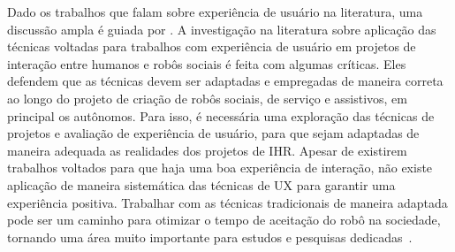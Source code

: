 Dado os trabalhos que falam sobre experiência de usuário na literatura, uma discussão ampla é guiada por \textcite{alenljung:2017}. A investigação na literatura sobre aplicação das técnicas voltadas para trabalhos com experiência de usuário em projetos de interação entre humanos e robôs sociais é feita com algumas críticas. Eles defendem que as técnicas devem ser adaptadas e empregadas de maneira correta ao longo do projeto de criação de robôs sociais, de serviço e assistivos, em principal os autônomos. Para isso, é necessária uma exploração das técnicas de projetos e avaliação de experiência de usuário, para que sejam adaptadas de maneira adequada as realidades dos projetos de IHR. Apesar de existirem trabalhos voltados para que haja uma boa experiência de interação, não existe aplicação de maneira sistemática das técnicas de UX para garantir uma experiência positiva. Trabalhar com as técnicas tradicionais de maneira adaptada pode ser um caminho para otimizar o tempo de aceitação do robô na sociedade, tornando uma área muito importante para estudos e pesquisas dedicadas~\cite{alenljung:2017}.
